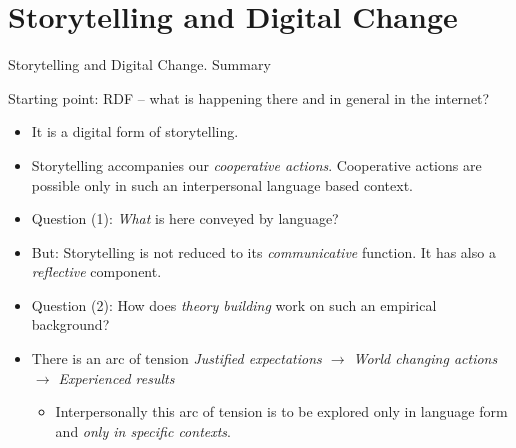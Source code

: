 \documentclass{beamer}
\title{Modelling Sustainable Systems\\ and Semantic Web\\[6pt] Knowledge and
  Action \vskip1em}
\subtitle{Lecture in the Module 10-202-2309\\ for Master Computer Science}
\author{Prof. Dr. Hans-Gert Gräbe\\
\url{http://www.informatik.uni-leipzig.de/~graebe}}
\date{July 2021}
\begin{document}
{
\begin{frame}
  \titlepage
\end{frame}}

\section{Storytelling and Digital Change}
\begin{frame}{Storytelling and Digital Change. Summary}

Starting point: RDF -- what is happening there and in general in the internet?
\begin{itemize}
\item It is a digital form of storytelling.
\item Storytelling accompanies our \emph{cooperative actions}. Cooperative
  actions are possible only in such an interpersonal language based context.
\item Question (1): \emph{What} is here conveyed by language?
\item But: Storytelling is not reduced to its \emph{communicative} function.
  It has also a \emph{reflective} component.
\item Question (2): How does \emph{theory building} work on such an empirical
  background?
\item There is an arc of tension \emph{Justified expectations $\to$ World
  changing actions $\to$ Experienced results}
  \begin{itemize}
  \item Interpersonally this arc of tension is to be explored only
    in language form and \emph{only in specific contexts}.
  \end{itemize}
\end{itemize}
\end{frame}
\end{document}
